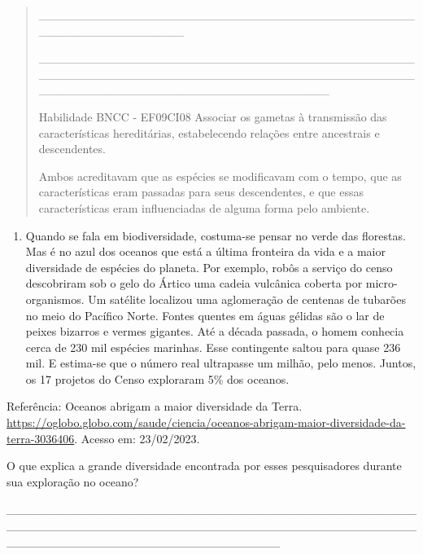 \begin{quote}
\_\_\_\_\_\_\_\_\_\_\_\_\_\_\_\_\_\_\_\_\_\_\_\_\_\_\_\_\_\_\_\_\_\_\_\_\_\_\_\_\_\_\_\_\_\_\_\_\_\_\_\_\_\_\_\_\_\_\_\_\_

\_\_\_\_\_\_\_\_\_\_\_\_\_\_\_\_\_\_\_\_\_\_\_\_\_\_\_\_\_\_\_\_\_\_\_\_\_\_\_\_\_\_\_\_\_\_\_\_\_\_\_\_\_\_\_\_\_\_\_\_\_\_\_\_\_\_\_\_\_\_\_\_\_\_\_\_\_\_\_\_\_\_\_\_\_\_\_\_\_\_\_\_\_\_\_\_\_\_\_\_\_\_\_\_\_\_\_\_\_\_\_\_\_\_\_\_\_\_\_\_\_\_

Habilidade BNCC - EF09CI08 Associar os gametas à transmissão das
características hereditárias, estabelecendo relações entre ancestrais e
descendentes.

Ambos acreditavam que as espécies se modificavam com o tempo, que as
características eram passadas para seus descendentes, e que essas
características eram influenciadas de alguma forma pelo ambiente.
\end{quote}

\begin{enumerate}
\def\labelenumi{\arabic{enumi}.}
\item
  Quando se fala em biodiversidade, costuma-se pensar no verde das
  florestas. Mas é no azul dos oceanos que está a última fronteira da
  vida e a maior diversidade de espécies do planeta. Por exemplo, robôs
  a serviço do censo descobriram sob o gelo do Ártico uma cadeia
  vulcânica coberta por micro-organismos. Um satélite localizou uma
  aglomeração de centenas de tubarões no meio do Pacífico Norte. Fontes
  quentes em águas gélidas são o lar de peixes bizarros e vermes
  gigantes. Até a década passada, o homem conhecia cerca de 230 mil
  espécies marinhas. Esse contingente saltou para quase 236 mil. E
  estima-se que o número real ultrapasse um milhão, pelo menos. Juntos,
  os 17 projetos do Censo exploraram 5\% dos oceanos.
\end{enumerate}

Referência: Oceanos abrigam a maior diversidade da Terra.
\url{https://oglobo.globo.com/saude/ciencia/oceanos-abrigam-maior-diversidade-da-terra-3036406}.
Acesso em: 23/02/2023.

O que explica a grande diversidade encontrada por esses pesquisadores
durante sua exploração no oceano?

\_\_\_\_\_\_\_\_\_\_\_\_\_\_\_\_\_\_\_\_\_\_\_\_\_\_\_\_\_\_\_\_\_\_\_\_\_\_\_\_\_\_\_\_\_\_\_\_\_\_\_\_\_\_\_\_\_\_\_\_\_\_\_\_\_\_\_\_\_\_\_\_\_\_\_\_\_\_\_\_\_\_\_\_\_\_\_\_\_\_\_\_\_\_\_\_\_\_\_\_\_\_\_\_\_\_\_\_\_\_\_\_\_\_\_\_\_\_\_\_\_\_\_\_\_\_\_\_

